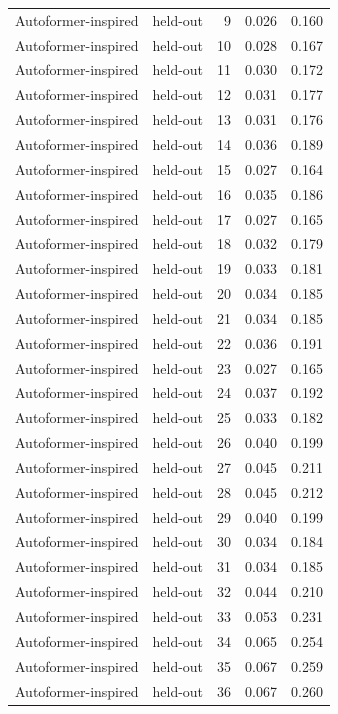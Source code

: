 \begin{tabular}{llrrr}
Autoformer-inspired & held-out & 9 & 0.026 & 0.160 \\
Autoformer-inspired & held-out & 10 & 0.028 & 0.167 \\
Autoformer-inspired & held-out & 11 & 0.030 & 0.172 \\
Autoformer-inspired & held-out & 12 & 0.031 & 0.177 \\
Autoformer-inspired & held-out & 13 & 0.031 & 0.176 \\
Autoformer-inspired & held-out & 14 & 0.036 & 0.189 \\
Autoformer-inspired & held-out & 15 & 0.027 & 0.164 \\
Autoformer-inspired & held-out & 16 & 0.035 & 0.186 \\
Autoformer-inspired & held-out & 17 & 0.027 & 0.165 \\
Autoformer-inspired & held-out & 18 & 0.032 & 0.179 \\
Autoformer-inspired & held-out & 19 & 0.033 & 0.181 \\
Autoformer-inspired & held-out & 20 & 0.034 & 0.185 \\
Autoformer-inspired & held-out & 21 & 0.034 & 0.185 \\
Autoformer-inspired & held-out & 22 & 0.036 & 0.191 \\
Autoformer-inspired & held-out & 23 & 0.027 & 0.165 \\
Autoformer-inspired & held-out & 24 & 0.037 & 0.192 \\
Autoformer-inspired & held-out & 25 & 0.033 & 0.182 \\
Autoformer-inspired & held-out & 26 & 0.040 & 0.199 \\
Autoformer-inspired & held-out & 27 & 0.045 & 0.211 \\
Autoformer-inspired & held-out & 28 & 0.045 & 0.212 \\
Autoformer-inspired & held-out & 29 & 0.040 & 0.199 \\
Autoformer-inspired & held-out & 30 & 0.034 & 0.184 \\
Autoformer-inspired & held-out & 31 & 0.034 & 0.185 \\
Autoformer-inspired & held-out & 32 & 0.044 & 0.210 \\
Autoformer-inspired & held-out & 33 & 0.053 & 0.231 \\
Autoformer-inspired & held-out & 34 & 0.065 & 0.254 \\
Autoformer-inspired & held-out & 35 & 0.067 & 0.259 \\
Autoformer-inspired & held-out & 36 & 0.067 & 0.260 \\

\end{tabular}
